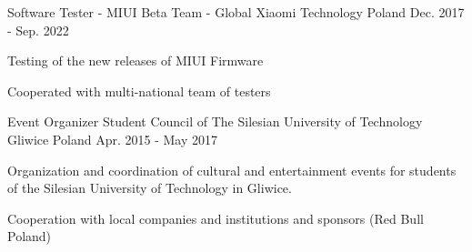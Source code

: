 

\begin{cventries}

  \cventry
    {Software Tester - MIUI Beta Team - Global} %
    {Xiaomi Technology} %
    {Poland} %
    {Dec. 2017 - Sep. 2022} %
    {
      \begin{cvitems} %
        \item {Testing of the new releases of MIUI Firmware}
        \item {Cooperated with multi-national team of testers}
      \end{cvitems}
    }

  \cventry
    {Event Organizer} %
    {Student Council of The Silesian University of Technology} %
    {Gliwice Poland} %
    {Apr. 2015 - May 2017 } %
    {
      \begin{cvitems} %
        \item {Organization and coordination of cultural and entertainment events for students of the Silesian University of Technology in Gliwice.}
        \item {Cooperation with local companies and institutions and sponsors (Red Bull Poland) }
      \end{cvitems}
    }

\end{cventries}
